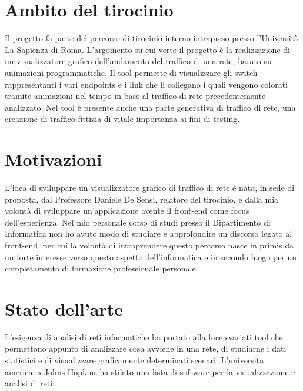 \documentclass[binding=0.6cm]{sapthesis}
\begin{document}
\section{Ambito del tirocinio}
Il progetto fa parte del percorso di tirocinio interno intrapreso presso l'Università La Sapienza di Roma. L'argomento su cui verte il progetto
è la realizzazione di un visualizzatore grafico dell'andamento del traffico di una rete, basato
su animazioni programmatiche. Il tool permette di visualizzare gli switch rappresentanti 
i vari endpoints e i link
che li collegano i quali vengono colorati tramite animazioni nel tempo in base al traffico di 
rete precedentemente analizzato. Nel tool è presente anche una parte generativa di traffico di rete,
una creazione di traffico fittizia di vitale importanza ai fini di testing.
\section{Motivazioni}
L'idea di sviluppare un visualizzatore grafico di traffico di rete è nata, 
in sede di proposta, dal Professore Daniele De Sensi, relatore del tirocinio, e dalla mia volontà di sviluppare un'applicazione avente il front-end
come focus dell'esperienza. Nel mio personale corso di studi presso il Dipartimento di Informatica non ho avuto modo
di studiare e approfondire un discorso legato al front-end, per cui la volontà di intraprendere questo percorso
nasce in primis da un forte interesse verso questo aspetto dell'informatica e in secondo luogo per un completamento di formazione professionale personale.
\section{Stato dell'arte}
L'esigenza di analisi di reti informatiche ha portato alla luce svariati tool che permettono
appunto di analizzare cosa avviene in una rete, di studiarne i dati statistici e di visualizzare
graficamente determinati scenari. L'universita americana Johns Hopkins\cite{JohnsHopkinsUniversity2024} ha stilato una lista
di software per la visualizzazione e analisi di reti\cite{JHUDatavisNetwork2024}:
\end{document}
